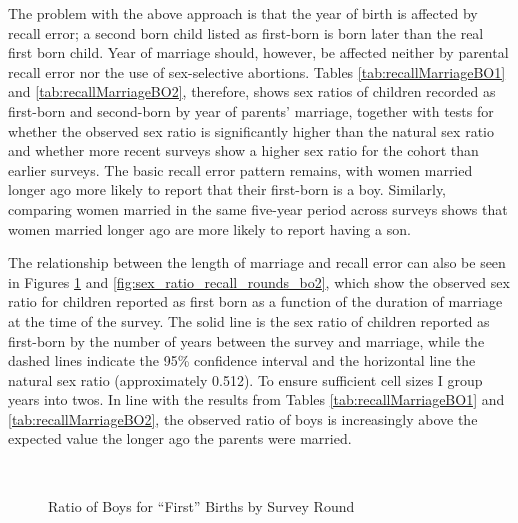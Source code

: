 \documentclass[12pt,letterpaper]{article}
\begin{document}
The problem with the above approach is that the year of birth is affected by recall error; 
a second born child listed as first-born is born later than the real first born child.
Year of marriage should, however, be affected neither by parental recall error 
nor the use of sex-selective abortions.
Tables \ref{tab:recallMarriageBO1} and \ref{tab:recallMarriageBO2}, therefore, shows sex 
ratios of children recorded as first-born and second-born by year of parents' marriage, 
together with tests for whether the observed sex ratio is significantly higher than the 
natural sex ratio and whether more recent surveys show a higher sex ratio for the cohort 
than earlier surveys.
The basic recall error pattern remains, with women married longer ago more
likely to report that their first-born is a boy.
Similarly, comparing women married in the same five-year period across surveys shows
that women married longer ago are more likely to report having a son.







The relationship between the length of marriage and recall error can also be seen in 
Figures \ref{fig:sex_ratio_recall_rounds_bo1} and \ref{fig:sex_ratio_recall_rounds_bo2}, 
which show the observed sex ratio for children reported as first born as a function of 
the duration of marriage at the time of the survey.
The solid line is the sex ratio of children reported as first-born by the number of years 
between the survey and marriage, while the dashed lines indicate the 95\% confidence 
interval and the horizontal line the natural sex ratio (approximately 0.512).
To ensure sufficient cell sizes I group years into twos.
In line with the results from Tables \ref{tab:recallMarriageBO1} and 
\ref{tab:recallMarriageBO2}, the observed ratio of boys is increasingly above the expected 
value the longer ago the parents were married.

\begin{figure}
\centering
{}
 \\
\caption{Ratio of Boys for ``First'' Births by Survey Round}
\label{fig:sex_ratio_recall_rounds_bo1}
\end{figure}
\end{document}
